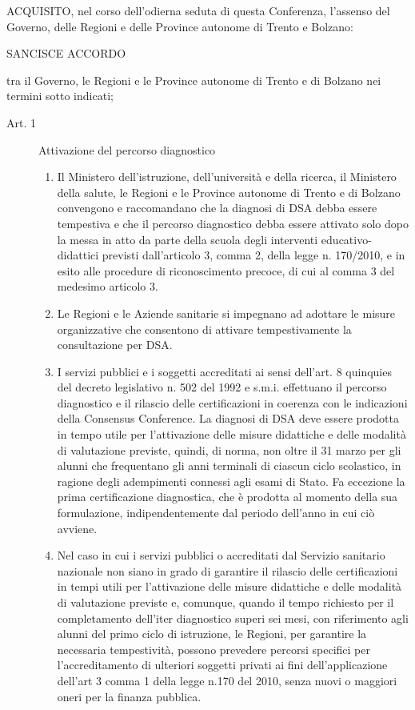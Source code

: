 ACQUISITO, nel corso dell'odierna seduta di questa Conferenza, l'assenso del Governo, delle Regioni e delle Province autonome di Trento e Bolzano:
\begin{center}
SANCISCE ACCORDO
\end{center}
tra il Governo, le Regioni e le Province autonome di Trento e di Bolzano nei termini sotto indicati;
\begin{description}
	\item[Art. 1] Attivazione del percorso diagnostico
	\begin{enumerate}
		\item Il Ministero dell'istruzione, dell'università e della ricerca, il Ministero della salute, le Regioni e le Province autonome di Trento e di Bolzano convengono e raccomandano che la diagnosi di DSA debba essere tempestiva e che il percorso diagnostico debba essere attivato solo dopo la messa in atto da parte della scuola degli interventi educativo-didattici previsti dall'articolo 3, comma 2, della legge n. 170/2010, e in esito alle procedure di riconoscimento precoce, di cui al comma 3 del medesimo articolo 3.
		\item Le Regioni e le Aziende sanitarie si impegnano ad adottare le misure organizzative che consentono di attivare tempestivamente la consultazione per DSA.
		\item I servizi pubblici e i soggetti accreditati ai sensi dell'art. 8 quinquies del decreto legislativo n. 502 del 1992 e s.m.i. effettuano il percorso diagnostico e il rilascio delle certificazioni in coerenza con le indicazioni della Consensus Conference. La diagnosi di DSA deve essere prodotta in tempo utile per l'attivazione delle misure didattiche e delle modalità di valutazione previste, quindi, di norma, non oltre il 31 marzo per gli alunni che frequentano gli anni terminali di ciascun ciclo scolastico, in ragione degli adempimenti connessi agli esami di Stato. Fa eccezione la prima certificazione diagnostica, che è prodotta al momento della sua formulazione, indipendentemente dal periodo dell'anno in cui ciò avviene.
		\item Nel caso in cui i servizi pubblici o accreditati dal Servizio sanitario nazionale non siano in grado di garantire il rilascio delle certificazioni in tempi utili per l'attivazione delle misure didattiche e delle modalità di valutazione previste e, comunque, quando il tempo richiesto per il completamento dell'iter diagnostico superi sei mesi, con riferimento agli alunni del primo ciclo di istruzione, le Regioni, per garantire la necessaria tempestività, possono prevedere percorsi specifici per l'accreditamento di ulteriori soggetti privati ai fini dell'applicazione dell'art 3 comma 1 della legge n.170 del 2010, senza nuovi o maggiori oneri per la finanza pubblica.

\end{enumerate}
\end{description}
